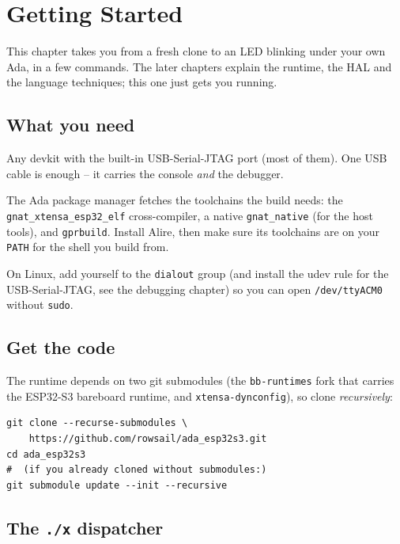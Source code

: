 \chapter{Getting Started}
\label{ch:getting-started}

This chapter takes you from a fresh clone to an LED blinking under your own Ada,
in a few commands. The later chapters explain the runtime, the HAL and the
language techniques; this one just gets you running.

\section{What you need}

\begin{description}[style=nextline]
\item[An ESP32-S3 board.] Any devkit with the built-in USB-Serial-JTAG port (most
  of them). One USB cable is enough -- it carries the console \emph{and} the
  debugger.
\item[Alire (\texttt{alr}).] The Ada package manager fetches the toolchains the
  build needs: the \texttt{gnat\_xtensa\_esp32\_elf} cross-compiler, a native
  \texttt{gnat\_native} (for the host tools), and \texttt{gprbuild}. Install Alire,
  then make sure its toolchains are on your \texttt{PATH} for the shell you build
  from.
\item[Serial-port permission.] On Linux, add yourself to the \texttt{dialout}
  group (and install the udev rule for the USB-Serial-JTAG, see the debugging
  chapter) so you can open \texttt{/dev/ttyACM0} without \texttt{sudo}.
\end{description}

\section{Get the code}

The runtime depends on two git submodules (the \texttt{bb-runtimes} fork that
carries the ESP32-S3 bareboard runtime, and \texttt{xtensa-dynconfig}), so clone
\emph{recursively}:

\begin{lstlisting}[style=sh]
git clone --recurse-submodules \
    https://github.com/rowsail/ada_esp32s3.git
cd ada_esp32s3
#  (if you already cloned without submodules:)
git submodule update --init --recursive
\end{lstlisting}

\section{The \texttt{./x} dispatcher}

